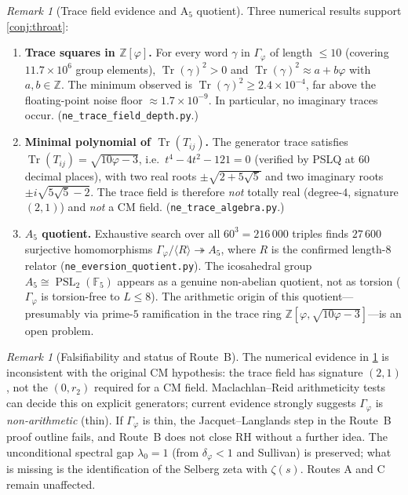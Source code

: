 \documentclass[11pt,a4paper]{article}
\theoremstyle{plain}
\theoremstyle{definition}
\theoremstyle{remark}
\newtheorem{remark}[theorem]{Remark}
\numberwithin{equation}{section}
\providecommand{\Z}{\mathbb{Z}}
\providecommand{\F}{\mathbb{F}}
\providecommand{\vp}{\varphi}
\DeclareMathOperator{\Tr}{Tr}
\providecommand{\PSL}{\operatorname{PSL}}
\begin{document}
\begin{remark}[Trace field evidence and A$_5$ quotient]
\label{rmk:throat-evidence}
Three numerical results support \cref{conj:throat}:
\begin{enumerate}
\item \textbf{Trace squares in $\Z[\vp]$.}
  For every word $\gamma$ in $\Gamma_\vp$ of length $\le 10$
  (covering $11.7\times 10^6$ group elements), $\Tr(\gamma)^2 > 0$
  and $\Tr(\gamma)^2 \approx a + b\vp$ with $a,b\in\Z$.
  The minimum observed is $\Tr(\gamma)^2 \ge 2.4 \times 10^{-4}$,
  far above the floating-point noise floor $\approx 1.7 \times 10^{-9}$.
  In particular, no imaginary traces occur.
  (\texttt{ne\_trace\_field\_depth.py}.)
\item \textbf{Minimal polynomial of $\Tr(T_{ij})$.}
  The generator trace satisfies
  $\Tr(T_{ij}) = \sqrt{10\vp-3}$, i.e.\ $t^4 - 4t^2 - 121 = 0$
  (verified by PSLQ at 60 decimal places), with two real roots
  $\pm\sqrt{2+5\sqrt{5}}$ and two imaginary roots $\pm i\sqrt{5\sqrt{5}-2}$.
  The trace field is therefore \emph{not} totally real
  (degree-$4$, signature $(2,1)$) and \emph{not} a CM field.
  (\texttt{ne\_trace\_algebra.py}.)
\item \textbf{$A_5$ quotient.}
  Exhaustive search over all $60^3 = 216\,000$ triples finds
  $27\,600$ surjective homomorphisms $\Gamma_\vp / \langle R \rangle
  \twoheadrightarrow A_5$, where $R$ is the confirmed length-$8$
  relator (\texttt{ne\_eversion\_quotient.py}).
  The icosahedral group $A_5 \cong \PSL_2(\F_5)$ appears as a
  genuine non-abelian quotient, not as torsion ($\Gamma_\vp$ is
  torsion-free to $L \le 8$).  The arithmetic origin of this
  quotient---presumably via prime-$5$ ramification in the trace
  ring $\Z[\vp, \sqrt{10\vp-3}]$---is an open problem.
\end{enumerate}
\end{remark}

\begin{remark}[Falsifiability and status of Route~B]
\label{rmk:route-b-falsifiable}
The numerical evidence in \cref{rmk:throat-evidence} is inconsistent
with the original CM hypothesis: the trace field has signature $(2,1)$,
not the $(0,r_2)$ required for a CM field.  Maclachlan--Reid
arithmeticity tests \cite{maclachlan-reid2003} can decide this on
explicit generators; current evidence strongly suggests $\Gamma_\vp$
is \emph{non-arithmetic} (thin).  If $\Gamma_\vp$ is thin, the
Jacquet--Langlands step in the Route~B proof outline fails, and
Route~B does not close RH without a further idea.  The unconditional
spectral gap $\lambda_0 = 1$ (from $\delta_\vp < 1$ and Sullivan)
is preserved; what is missing is the identification of the Selberg
zeta with $\zeta(s)$.  Routes A and C remain unaffected.
\end{remark}
\end{document}
